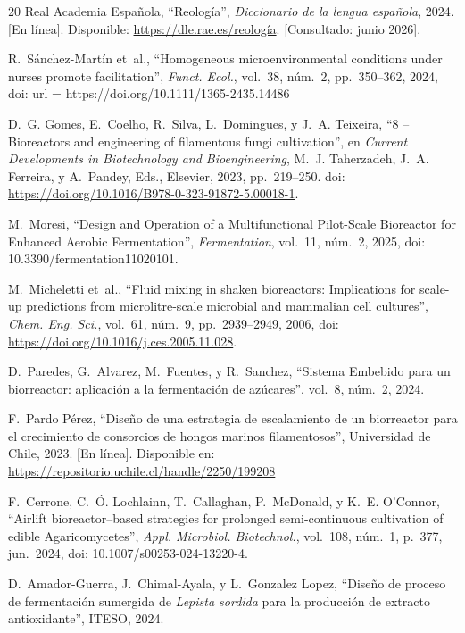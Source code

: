 \documentclass[11pt,tesis,twoside,openright,spanish]{upiiztt}
\begin{document}
\begin{thebibliography}{20}
{Real Academia Española}, ``Reología'', \textit{Diccionario de la lengua española}, 2024. [En línea]. Disponible: \url{https://dle.rae.es/reología}. [Consultado: junio 2026].

R.~Sánchez-Martín et~al., ``Homogeneous microenvironmental conditions under nurses promote facilitation'', \textit{Funct. Ecol.}, vol.~38, núm.~2, pp.~350--362, 2024, doi: url = {https://doi.org/10.1111/1365-2435.14486}

D.~G. Gomes, E.~Coelho, R.~Silva, L.~Domingues, y J.~A. Teixeira, ``8 -- Bioreactors and engineering of filamentous fungi cultivation'', en \textit{Current Developments in Biotechnology and Bioengineering}, M.~J. Taherzadeh, J.~A. Ferreira, y A.~Pandey, Eds., Elsevier, 2023, pp.~219--250. doi: \url{https://doi.org/10.1016/B978-0-323-91872-5.00018-1}.

M.~Moresi, ``Design and Operation of a Multifunctional Pilot-Scale Bioreactor for Enhanced Aerobic Fermentation'', \textit{Fermentation}, vol.~11, núm.~2, 2025, doi: 10.3390/fermentation11020101.

M.~Micheletti et~al., ``Fluid mixing in shaken bioreactors: Implications for scale-up predictions from microlitre-scale microbial and mammalian cell cultures'', \textit{Chem. Eng. Sci.}, vol.~61, núm.~9, pp.~2939--2949, 2006, doi: \url{https://doi.org/10.1016/j.ces.2005.11.028}.

D.~Paredes, G.~Alvarez, M.~Fuentes, y R.~Sanchez, ``Sistema Embebido para un biorreactor: aplicación a la fermentación de azúcares'', vol.~8, núm.~2, 2024.

F.~Pardo Pérez, ``Diseño de una estrategia de escalamiento de un biorreactor para el crecimiento de consorcios de hongos marinos filamentosos'', Universidad de Chile, 2023. [En línea]. Disponible en: \url{https://repositorio.uchile.cl/handle/2250/199208}

F.~Cerrone, C.~Ó. Lochlainn, T.~Callaghan, P.~McDonald, y K.~E. O'Connor, ``Airlift bioreactor--based strategies for prolonged semi-continuous cultivation of edible Agaricomycetes'', \textit{Appl. Microbiol. Biotechnol.}, vol.~108, núm.~1, p.~377, jun.~2024, doi: 10.1007/s00253-024-13220-4.

D.~Amador-Guerra, J.~Chimal-Ayala, y L.~Gonzalez Lopez, ``Diseño de proceso de fermentación sumergida de \textit{Lepista sordida} para la producción de extracto antioxidante'', ITESO, 2024.


\end{thebibliography}
\end{document}
